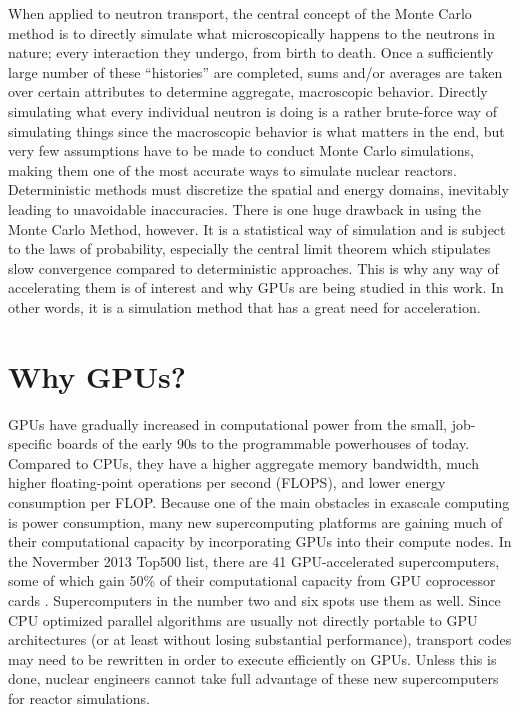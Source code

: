 When applied to neutron transport, the central concept of the Monte Carlo method is to directly simulate what  microscopically happens to the neutrons in nature; every interaction they undergo, from birth to death.  Once a sufficiently large number of these ``histories'' are completed, sums and/or averages are taken over certain attributes to determine aggregate, macroscopic behavior.  Directly simulating what every individual neutron is doing is a rather brute-force way of simulating things since the macroscopic behavior is what matters in the end, but very few assumptions have to be made to conduct Monte Carlo simulations, making them one of the most accurate ways to simulate nuclear reactors.  Deterministic methods must discretize the spatial and energy domains, inevitably leading to unavoidable inaccuracies.  There is one huge drawback in using the Monte Carlo Method, however.  It is a statistical way of simulation and is subject to the laws of probability, especially the central limit theorem which stipulates slow convergence compared to deterministic approaches.  This is why any way of accelerating them is of interest and why GPUs are being studied in this work.  In other words, it is a simulation method that has a great need for acceleration. 

\section{Why GPUs?}

GPUs have gradually increased in computational power from the small, job-specific boards of the early 90s to the programmable powerhouses of today.  Compared to CPUs, they have a higher aggregate memory bandwidth, much higher floating-point operations per second (FLOPS), and lower energy consumption per FLOP.  Because one of the main obstacles in exascale computing is power consumption, many new supercomputing platforms are gaining much of their computational capacity by incorporating GPUs into their compute nodes.  In the Novermber 2013 Top500 list, there are 41 GPU-accelerated supercomputers, some of which gain 50\% of their computational capacity from GPU coprocessor cards \cite{top500}.  Supercomputers in the number two and six spots use them as well.  Since CPU optimized parallel algorithms are usually not directly portable to GPU architectures (or at least without losing substantial performance), transport codes may need to be rewritten in order to execute efficiently on GPUs.  Unless this is done, nuclear engineers cannot take full advantage of these new supercomputers for reactor simulations.

